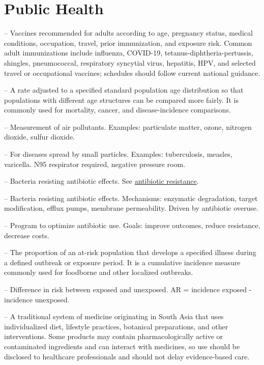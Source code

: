 \chapter{Public Health}

-- Vaccines recommended for adults according to age, pregnancy status, medical conditions, occupation, travel, prior immunization, and exposure risk. Common adult immunizations include influenza, COVID-19, tetanus-diphtheria-pertussis, shingles, pneumococcal, respiratory syncytial virus, hepatitis, HPV, and selected travel or occupational vaccines; schedules should follow current national guidance.

-- A rate adjusted to a specified standard population age distribution so that populations with different age structures can be compared more fairly. It is commonly used for mortality, cancer, and disease-incidence comparisons.

-- Measurement of air pollutants. Examples: particulate matter, ozone, nitrogen dioxide, sulfur dioxide.

-- For diseases spread by small particles. Examples: tuberculosis, measles, varicella. N95 respirator required, negative pressure room.

-- Bacteria resisting antibiotic effects. See \hyperlink{Antibiotic Resistance}{antibiotic resistance}.

-- Bacteria resisting antibiotic effects. Mechanisms: enzymatic degradation, target modification, efflux pumps, membrane permeability. Driven by antibiotic overuse.

-- Program to optimize antibiotic use. Goals: improve outcomes, reduce resistance, decrease costs.



-- The proportion of an at-risk population that develops a specified illness during a defined outbreak or exposure period. It is a cumulative incidence measure commonly used for foodborne and other localized outbreaks.

-- Difference in risk between exposed and unexposed. AR = incidence exposed - incidence unexposed.

-- A traditional system of medicine originating in South Asia that uses individualized diet, lifestyle practices, botanical preparations, and other interventions. Some products may contain pharmacologically active or contaminated ingredients and can interact with medicines, so use should be disclosed to healthcare professionals and should not delay evidence-based care.

